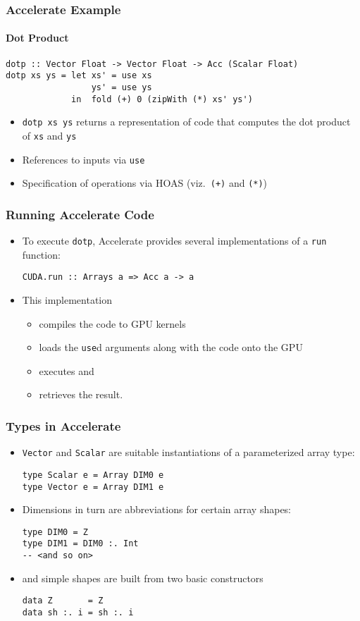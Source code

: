\documentclass{beamer}
\begin{document}
\begin{frame}[fragile]
  \frametitle{Accelerate Example}
  \framesubtitle{Dot Product}
\begin{verbatim}
dotp :: Vector Float -> Vector Float -> Acc (Scalar Float)
dotp xs ys = let xs' = use xs
                 ys' = use ys
             in  fold (+) 0 (zipWith (*) xs' ys')
\end{verbatim}
  \begin{itemize}
  \item \texttt{dotp xs ys} returns a representation of code that
    computes the dot product of \texttt{xs} and \texttt{ys}
  \item References to inputs via \texttt{use}
  \item Specification of operations via HOAS (viz.\ \texttt{(+)} and \texttt{(*)})
  \end{itemize}
\end{frame}

\begin{frame}[fragile]
  \frametitle{Running Accelerate Code}
  \begin{itemize}
  \item To execute \texttt{dotp}, Accelerate provides several
    implementations of a \texttt{run} function:
\begin{verbatim}
CUDA.run :: Arrays a => Acc a -> a
\end{verbatim}
  \item This implementation
    \begin{itemize}
    \item compiles the code to GPU kernels
    \item loads the \texttt{use}d arguments along with the code onto
      the GPU
    \item executes and
    \item retrieves the result.
    \end{itemize}
  \end{itemize}
\end{frame}

\begin{frame}[fragile]
  \frametitle{Types in Accelerate}
  \begin{itemize}
  \item \texttt{Vector} and \texttt{Scalar} are suitable
    instantiations of a parameterized array type:
\begin{verbatim}
type Scalar e = Array DIM0 e
type Vector e = Array DIM1 e
\end{verbatim}
  \item Dimensions in turn are abbreviations for certain array shapes:
\begin{verbatim}
type DIM0 = Z
type DIM1 = DIM0 :. Int
-- <and so on>
\end{verbatim}
  \item and simple shapes are built from two basic constructors
\begin{verbatim}
data Z       = Z
data sh :. i = sh :. i
\end{verbatim}
  \end{itemize}
\end{frame}
\end{document}
